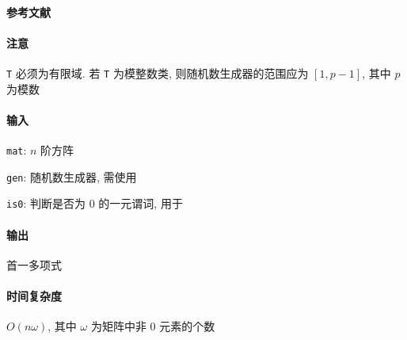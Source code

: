 \paragraph{参考文献} \cite{wiedemann1986solving}

\paragraph{注意} \verb|T| 必须为有限域. 若 \verb|T| 为模整数类, 则随机数生成器的范围应为 \([1, p-1]\), 其中 \(p\) 为模数

\paragraph{输入}

\verb|mat|: \(n\) 阶方阵

\verb|gen|: 随机数生成器, 需使用 

\verb|is0|: 判断是否为 \(0\) 的一元谓词, 用于 

\paragraph{输出} 首一多项式

\paragraph{时间复杂度}

\(O(n\omega)\), 其中 \(\omega\) 为矩阵中非 \(0\) 元素的个数
